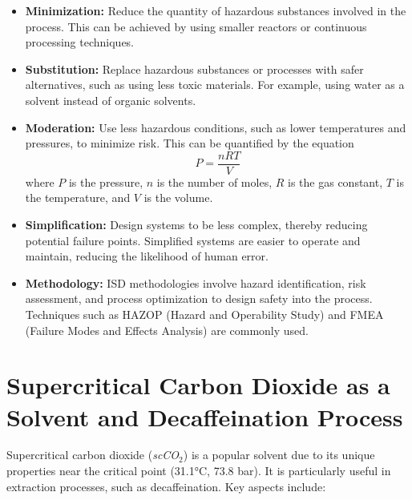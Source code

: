 \documentclass[11pt]{article}
\begin{document}
\begin{itemize}
    \item \textbf{Minimization:} Reduce the quantity of hazardous substances involved in the process. This can be achieved by using smaller reactors or continuous processing techniques.
    \item \textbf{Substitution:} Replace hazardous substances or processes with safer alternatives, such as using less toxic materials. For example, using water as a solvent instead of organic solvents.
    \item \textbf{Moderation:} Use less hazardous conditions, such as lower temperatures and pressures, to minimize risk. This can be quantified by the equation 
    \[
    P = \frac{nRT}{V}
    \]
    where \( P \) is the pressure, \( n \) is the number of moles, \( R \) is the gas constant, \( T \) is the temperature, and \( V \) is the volume.
    \item \textbf{Simplification:} Design systems to be less complex, thereby reducing potential failure points. Simplified systems are easier to operate and maintain, reducing the likelihood of human error.
    \item \textbf{Methodology:} ISD methodologies involve hazard identification, risk assessment, and process optimization to design safety into the process. Techniques such as HAZOP (Hazard and Operability Study) and FMEA (Failure Modes and Effects Analysis) are commonly used.
\end{itemize}

\section{Supercritical Carbon Dioxide as a Solvent and Decaffeination Process}
Supercritical carbon dioxide (\textit{scCO}$_2$) is a popular solvent due to its unique properties near the critical point (31.1°C, 73.8 bar). It is particularly useful in extraction processes, such as decaffeination. Key aspects include:
\end{document}
